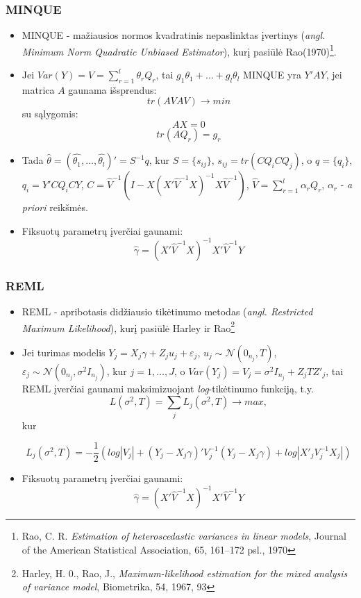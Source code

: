 \documentclass[utf8,hyperref={unicode,pdftex}]{beamer}
\begin{document}
\begin{frame}
\frametitle{MINQUE}
\begin{small}
\begin{itemize}
\item \indent MINQUE - mažiausios normos kvadratinis nepaslinktas įvertinys (\textit{angl. Minimum Norm Quadratic Unbiased Estimator}), kurį pasiūlė Rao(1970)\footnote{Rao, C. R.  \textit{Estimation of heteroscedastic variances in linear models}, Journal of the American Statistical Association, 65, 161–172 psl., 1970}.\\
 

\item \indent Jei $Var(Y)=V= \sum^l_{r=1}\theta_r Q_r$, tai $g_1 \theta_1+\dots+g_l \theta_l$ MINQUE yra $Y'AY$, jei matrica $A$ gaunama išsprendus:
\[tr(AVAV) \to min\]
su sąlygomis:
\[AX = 0\]
\[tr(AQ_r)=g_r\]
\item Tada $\hat{\theta} = (\hat{\theta_1},\dots,\hat{\theta_l})'=S^{-1}q$, kur $S=\{s_{ij}\}$, $s_{ij}=tr(CQ_iCQ_j)$, o
$q=\{q_i\}$, $q_i=Y'CQ_iCY$, $C = \hat{V}^{-1}(I-X(X' \hat{V}^{-1}X)^{-1}X \hat{V}^{-1})$, $\hat{V}=\sum^l_{r=1}\alpha_rQ_r$, $\alpha_r$ - \textit{a priori} reikšmės.

\item Fiksuotų parametrų įverčiai gaunami:
\[\hat{\gamma}=(X'\hat{V}^{-1}X)^{-1}X'\hat{V}^{-1}Y\]
\end{itemize}
\end{small}
\end{frame}

\begin{frame}
\frametitle{REML}
\begin{itemize}
\item REML - apribotasis didžiausio tikėtinumo metodas (\textit{angl. Restricted Maximum Likelihood}), kurį pasiūlė Harley ir Rao\footnote{Harley, H. 0., Rao, J., \textit{Maximum-likelihood estimation for the mixed analysis of variance model}, Biometrika, 54, 1967, 93}\\
\item Jei turimas modelis $Y_j=X_j\gamma+Z_ju_j+\varepsilon_j$, $u_j\sim \mathcal{N}(0_{n_j}, T)$, $\varepsilon_j\sim \mathcal{N}(0_{n_j}, \sigma^2 I_{n_j})$, kur $j=1,\dots,J$, o $Var(Y_j)=V_j=\sigma^2 I_{n_j} + Z_jTZ'_j$, tai REML įverčiai gaunami maksimizuojant \textit{log}-tikėtinumo funkciją, t.y.
\[
L(\sigma^2, T)=\sum_j L_j(\sigma^2, T) \to max,
\]
kur
\begin{small}
\[
L_j(\sigma^2, T)=-\frac{1}{2}\left( log|V_j|+(Y_j-X_j\gamma)'V_j^{-1}(Y_j-X_j\gamma)+log|X'_jV_j^{-1}X_j|\right)
\]
\end{small}
\item Fiksuotų parametrų įverčiai gaunami:
\[\hat{\gamma}=(X'\hat{V}^{-1}X)^{-1}X'\hat{V}^{-1}Y\]
\end{itemize}
\end{frame}
\end{document}
